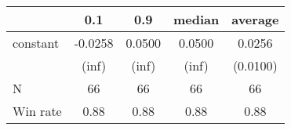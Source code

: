 \begin{tabular}{lcccc}
\hline
         &   0.1   &  0.9   & median & average   \\
\midrule
\midrule
constant & -0.0258 & 0.0500 & 0.0500 & 0.0256    \\
         & (inf)   & (inf)  & (inf)  & (0.0100)  \\
N        & 66      & 66     & 66     & 66        \\
Win rate & 0.88    & 0.88   & 0.88   & 0.88      \\
\hline
\end{tabular}